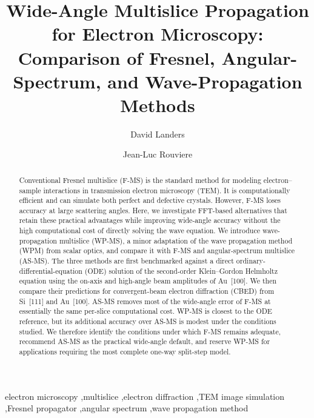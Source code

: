 \documentclass[preprint,12pt,number]{elsarticle}
\begin{document}
\begin{frontmatter}

\title{Wide-Angle Multislice Propagation for Electron Microscopy:
Comparison of Fresnel, Angular-Spectrum, and Wave-Propagation Methods}
\author[inst1]{David Landers}
\author[inst1]{Jean-Luc Rouviere}

\begin{abstract}

Conventional Fresnel multislice (F-MS) is the standard method for modeling
electron--sample interactions in transmission electron microscopy (TEM). It is
computationally efficient and can simulate both perfect and defective crystals.
However, F-MS loses accuracy at large scattering angles.
Here, we investigate
FFT-based alternatives that retain these practical advantages while improving
wide-angle accuracy
without the high
computational cost of directly solving the wave equation. 
We introduce
wave-propagation multislice (WP-MS), a minor adaptation of the wave propagation
method (WPM) from scalar optics, and compare it with F-MS and angular-spectrum
multislice (AS-MS). The three methods are first benchmarked against a direct
ordinary-differential-equation (ODE) solution of the second-order Klein--Gordon
Helmholtz equation using the on-axis and high-angle beam amplitudes of Au~[100].
We then compare their predictions for convergent-beam electron
diffraction (CBED) from Si~[111] and Au~[100]. AS-MS removes most of the wide-angle
error of F-MS at essentially the same per-slice computational cost. WP-MS is
closest to the ODE reference, but its additional accuracy over AS-MS is modest
under the conditions studied. We therefore identify the conditions under which
F-MS remains adequate, recommend AS-MS as the practical wide-angle default, and
reserve WP-MS for applications requiring the most complete one-way split-step
model.
\end{abstract}

\begin{keyword}
electron microscopy \sep multislice \sep electron diffraction \sep TEM image simulation \sep Fresnel propagator \sep angular spectrum \sep wave propagation method
\end{keyword}

\end{frontmatter}
\end{document}

